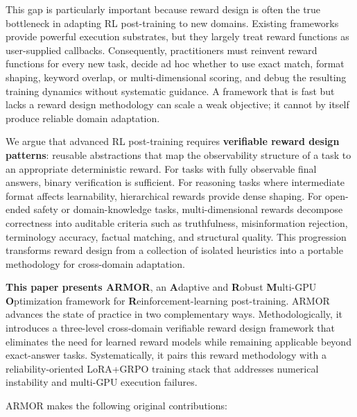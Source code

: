 \documentclass{ieeeaccess}
\begin{document}
This gap is particularly important because reward design is often the true
bottleneck in adapting RL post-training to new domains.  Existing frameworks
provide powerful execution substrates, but they largely treat reward functions
as user-supplied callbacks.  Consequently, practitioners must reinvent
reward functions for every new task, decide ad hoc whether to use exact match,
format shaping, keyword overlap, or multi-dimensional scoring, and debug the
resulting training dynamics without systematic guidance.  A framework that is
fast but lacks a reward design methodology can scale a weak objective; it
cannot by itself produce reliable domain adaptation.

We argue that advanced RL post-training requires \textbf{verifiable reward
design patterns}: reusable abstractions that map the observability structure
of a task to an appropriate deterministic reward.  For tasks with fully
observable final answers, binary verification is sufficient.  For reasoning
tasks where intermediate format affects learnability, hierarchical rewards
provide dense shaping.  For open-ended safety or domain-knowledge tasks,
multi-dimensional rewards decompose correctness into auditable criteria such
as truthfulness, misinformation rejection, terminology accuracy, factual
matching, and structural quality.  This progression transforms reward design
from a collection of isolated heuristics into a portable methodology for
cross-domain adaptation.

\textbf{This paper presents ARMOR}, an \textbf{A}daptive and \textbf{R}obust
\textbf{M}ulti-GPU \textbf{O}ptimization framework for \textbf{R}einforcement-learning
post-training.  ARMOR advances the state of practice in two complementary
ways.  Methodologically, it introduces a three-level cross-domain verifiable
reward design framework that eliminates the need for learned reward models
while remaining applicable beyond exact-answer tasks.  Systematically, it
pairs this reward methodology with a reliability-oriented LoRA+GRPO training
stack that addresses numerical instability and multi-GPU execution failures.

ARMOR makes the following original contributions:
\end{document}
